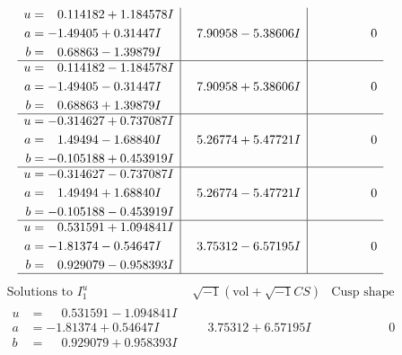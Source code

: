 \documentclass[1p]{elsarticle_modified}
\theoremstyle{definition}
\newcommand{\I}{\sqrt{-1}}
\begin{document}
$$\begin{array}{c|c|c}
\begin{aligned}
u &= \phantom{-}0.114182 + 1.184578 I \\
a &= -1.49405 + 0.31447 I \\
b &= \phantom{-}0.68863 - 1.39879 I\end{aligned}
 & \phantom{-}7.90958 - 5.38606 I & \phantom{-0.000000 } 0 \\ \hline\begin{aligned}
u &= \phantom{-}0.114182 - 1.184578 I \\
a &= -1.49405 - 0.31447 I \\
b &= \phantom{-}0.68863 + 1.39879 I\end{aligned}
 & \phantom{-}7.90958 + 5.38606 I & \phantom{-0.000000 } 0 \\ \hline\begin{aligned}
u &= -0.314627 + 0.737087 I \\
a &= \phantom{-}1.49494 - 1.68840 I \\
b &= -0.105188 + 0.453919 I\end{aligned}
 & \phantom{-}5.26774 + 5.47721 I & \phantom{-0.000000 } 0 \\ \hline\begin{aligned}
u &= -0.314627 - 0.737087 I \\
a &= \phantom{-}1.49494 + 1.68840 I \\
b &= -0.105188 - 0.453919 I\end{aligned}
 & \phantom{-}5.26774 - 5.47721 I & \phantom{-0.000000 } 0 \\ \hline\begin{aligned}
u &= \phantom{-}0.531591 + 1.094841 I \\
a &= -1.81374 - 0.54647 I \\
b &= \phantom{-}0.929079 - 0.958393 I\end{aligned}
 & \phantom{-}3.75312 - 6.57195 I & \phantom{-0.000000 } 0\\
 \hline 
 \end{array}$$\newpage$$\begin{array}{c|c|c}  
\text{Solutions to }I^u_{1}& \I (\text{vol} + \sqrt{-1}CS) & \text{Cusp shape}\\
 \hline 
\begin{aligned}
u &= \phantom{-}0.531591 - 1.094841 I \\
a &= -1.81374 + 0.54647 I \\
b &= \phantom{-}0.929079 + 0.958393 I\end{aligned}
 & \phantom{-}3.75312 + 6.57195 I & \phantom{-0.000000 } 0 \\ \hline\begin{aligned}

\end{aligned}
\end{array}$$
\end{document}
